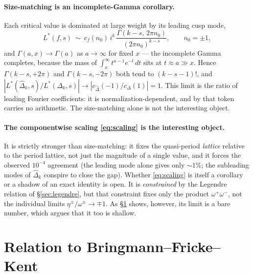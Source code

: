 \documentclass[11pt]{article}
\newcommand{\Dhat}{\widehat\Delta}
\begin{document}
\paragraph{Size-matching is an incomplete-Gamma corollary.} Each critical value is
dominated at large weight by its leading cusp mode,
\begin{equation}\label{eq:leadmode}
L^*(f,s)\ \sim\ c_f(n_0)\,i^k\,\frac{\Gamma(k-s,\,2\pi n_0)}{(2\pi n_0)^{k-s}},
\qquad n_0=\pm1,
\end{equation}
and $\Gamma(a,x)\to\Gamma(a)$ as $a\to\infty$ for fixed $x$ --- the incomplete Gamma
completes, because the mass of $\int_x^\infty t^{a-1}e^{-t}\,dt$ sits at $t\approx a\gg x$.
Hence $\Gamma(k-s,+2\pi)$ and $\Gamma(k-s,-2\pi)$ both tend to $(k-s-1)!$, and
$|L^*(\Dhat_k,s)/L^*(\Delta_k,s)|\to|c_{\Dhat}(-1)/c_\Delta(1)|=1$. This limit is the ratio
of leading Fourier coefficients: it is normalization-dependent, and by that token carries
no arithmetic. The size-matching alone is not the interesting object.

\paragraph{The componentwise scaling \eqref{eq:scaling} is the interesting object.} It is
strictly stronger than size-matching: it fixes the quasi-period \emph{lattice} relative to
the period lattice, not just the magnitude of a single value, and it forces the observed
$10^{-4}$ agreement (the leading mode alone gives only $\sim1\%$; the subleading modes of
$\Dhat_k$ conspire to close the gap). Whether \eqref{eq:scaling} is itself a corollary or a
shadow of an exact identity is open. It is \emph{constrained} by the Legendre relation of
\S\ref{sec:legendre}, but that constraint fixes only the product $\omega^+\omega^-$, not the
individual limits $\eta^\pm/\omega^\pm\to\mp1$. As \S\ref{sec:bfk} shows, however, its limit
is a bare number, which argues that it too is shallow.

\section{Relation to Bringmann--Fricke--Kent}\label{sec:bfk}
\end{document}
